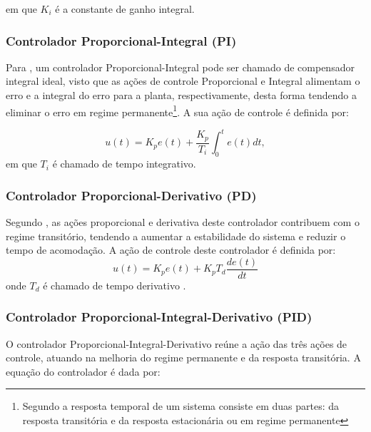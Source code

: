 em que $K_i$ é a constante de ganho integral. 

\subsubsection{Controlador Proporcional-Integral (PI)}

Para , um controlador Proporcional-Integral pode ser chamado de compensador integral ideal, visto que 
as ações de controle Proporcional e Integral alimentam o erro e a integral do erro para a planta, respectivamente, desta forma 
tendendo a eliminar o erro em regime permanente\footnote{Segundo  a resposta temporal de um sistema consiste em duas 
partes: da resposta transitória e da resposta estacionária ou em regime permanente}. 
A sua ação de controle é definida por: 

\begin{equation}
 u(t) = K_pe(t) + \frac{K_p}{T_i}\int_{0}^{t}e(t)dt,
\end{equation}
em que $T_i$ é chamado de tempo integrativo. 


\subsubsection{Controlador Proporcional-Derivativo (PD)}


Segundo , as ações proporcional e derivativa deste controlador 
contribuem com o regime transitório, %
tendendo a aumentar a estabilidade do sistema e reduzir o tempo de acomodação. 
A ação de controle deste controlador é definida por:
\begin{equation}
 u(t) = K_pe(t) + K_pT_d\frac{de(t)}{dt}
\end{equation}
onde $T_d$ é chamado de tempo derivativo \cite{ogata}.


\subsubsection{Controlador Proporcional-Integral-Derivativo (PID)}

O controlador Proporcional-Integral-Derivativo reúne a ação das três ações de controle, atuando na melhoria do 
regime permanente e da resposta transitória. 
A equação do controlador é dada por:


